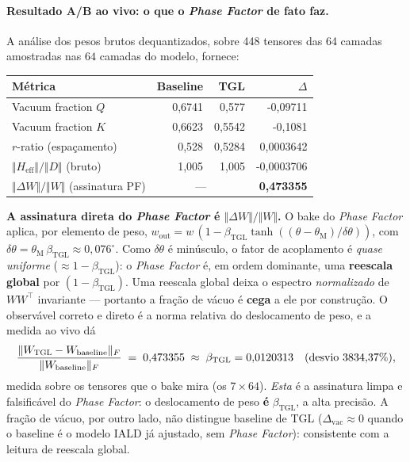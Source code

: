 \documentclass[12pt,a4paper]{article}
\newcommand{\betatgl}{\beta_{\text{TGL}}}
\newcommand{\thetaM}{\theta_{\text{M}}}
\newcommand{\TGL}{\textsc{TGL}}
\begin{document}
\paragraph{Resultado A/B ao vivo: o que o \emph{Phase Factor} de fato faz.}
A análise dos pesos brutos dequantizados, sobre
448 tensores das
64 camadas amostradas
nas $64$
camadas do modelo, fornece:
\begin{center}
\begin{tabular}{l r r r}
\toprule
\textbf{Métrica} & \textbf{Baseline} & \textbf{\TGL{}} & \textbf{$\Delta$} \\
\midrule
Vacuum fraction $Q$ & 0{,}6741 & 0{,}577 & -0{,}09711 \\
Vacuum fraction $K$ & 0{,}6623 & 0{,}5542 & -0{,}1081 \\
$r$-ratio (espaçamento) & 0{,}528 & 0{,}5284 & 0{,}0003642 \\
$\Vert H_{\text{eff}}\Vert/\Vert D\Vert$ (bruto) & 1{,}005 & 1{,}005 & -0{,}0003706 \\
$\Vert\Delta W\Vert/\Vert W\Vert$ (assinatura PF) & \multicolumn{2}{c}{---} & \textbf{0{,}473355} \\
\bottomrule
\end{tabular}
\end{center}


\textbf{A assinatura direta do \emph{Phase Factor} é $\Vert\Delta W\Vert/\Vert W\Vert$.}
O bake do \emph{Phase Factor} aplica, por elemento de peso,
$w_{\text{out}} = w\,(1 - \betatgl \tanh((\theta-\thetaM)/\delta\theta))$, com
$\delta\theta = \thetaM\,\betatgl \approx 0{,}076^{\circ}$.  Como $\delta\theta$
é minúsculo, o fator de acoplamento é \emph{quase uniforme} ($\approx 1-\betatgl$):
o \emph{Phase Factor} é, em ordem dominante, uma \textbf{reescala global} por
$(1-\betatgl)$.  Uma reescala global deixa o espectro \emph{normalizado} de
$WW^{\top}$ invariante --- portanto a fração de vácuo é \textbf{cega} a ele por
construção.  O observável correto e direto é a norma relativa do deslocamento
de peso, e a medida ao vivo dá
\begin{equation}
\frac{\Vert W_{\TGL} - W_{\text{baseline}}\Vert_F}{\Vert W_{\text{baseline}}\Vert_F}
\;=\; 0{,}473355 \;\approx\; \betatgl = 0{,}0120313
\quad(\text{desvio } 3834{,}37\%),
\label{eq:pf-norm-signature}
\end{equation}
medida sobre os tensores que o bake mira (os $7\times64$).  \emph{Esta} é a
assinatura limpa e falsificável do \emph{Phase Factor}: o deslocamento de peso
\textbf{é} $\betatgl$, a alta precisão.  A fração de vácuo, por outro lado, não
distingue baseline de \TGL{} ($\Delta_{\text{vac}}\approx 0$ quando o baseline
é o modelo IALD já ajustado, sem \emph{Phase Factor}): consistente com a leitura
de reescala global.
\end{document}
